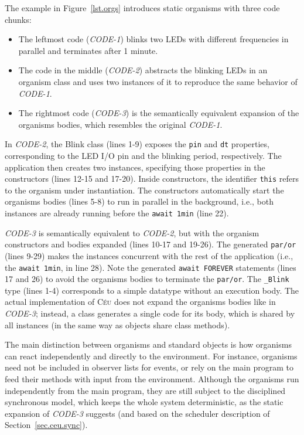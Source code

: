 \documentclass{sigplanconf}
\newcommand{\CEU}{\textsc{C\'{e}u}\xspace}
\newcommand{\code}[1] {{\small{\texttt{#1}}}}
\newcommand{\1}{\;}
\newcommand{\2}{\;\;}
\newcommand{\3}{\;\;\;}
\newcommand{\5}{\;\;\;\;\;}
\begin{document}
The example in Figure~\ref{lst.orgs} introduces static organisms with three 
code chunks:
%
\begin{itemize}
\item The leftmost code (\emph{CODE-1}) blinks two LEDs with different 
frequencies in parallel and terminates after 1 minute.
%
\item The code in the middle (\emph{CODE-2}) abstracts the blinking LEDs in an 
organism class and uses two instances of it to reproduce the same behavior of 
\emph{CODE-1}.
%
\item The rightmost code (\emph{CODE-3}) is the semantically equivalent 
expansion of the organisms bodies, which resembles the original \emph{CODE-1}.
\end{itemize}
%
In \emph{CODE-2}, the Blink class (lines 1-9) exposes the \code{pin} and 
\code{dt} properties, corresponding to the LED I/O pin and the blinking period, 
respectively.
The application then creates two instances, specifying those properties in the 
constructors (lines 12-15 and 17-20).
Inside constructors, the identifier \code{this} refers to the organism under 
instantiation.
The constructors automatically start the organisms bodies (lines 5-8) to run in 
parallel in the background, i.e., both instances are already running before the 
\code{await 1min} (line 22).

\emph{CODE-3} is semantically equivalent to \emph{CODE-2}, but with the 
organism constructors and bodies expanded (lines 10-17 and 19-26).
The generated \code{par/or} (lines 9-29) makes the instances concurrent with 
the rest of the application (i.e., the \code{await 1min}, in line 28).
Note the generated \code{await FOREVER} statements (lines 17 and 26) to avoid 
the organisms bodies to terminate the \code{par/or}.
The \code{\_Blink} type (lines 1-4) corresponds to a simple datatype without an
execution body.
%
The actual implementation of \CEU does not expand the organisms bodies like in 
\emph{CODE-3}; instead, a class generates a single code for its body, which is 
shared by all instances (in the same way as objects share class methods).

The main distinction between organisms and standard objects is how organisms 
can react independently and directly to the environment.
%
For instance, organisms need not be included in observer lists for events, or 
rely on the main program to feed their methods with input from the environment.
%
Although the organisms run independently from the main program, they are still 
subject to the disciplined synchronous model, which keeps the whole system 
deterministic, as the static expansion of \emph{CODE-3} suggests (and based on 
the scheduler description of Section~\ref{sec.ceu.sync}).
%
\end{document}
